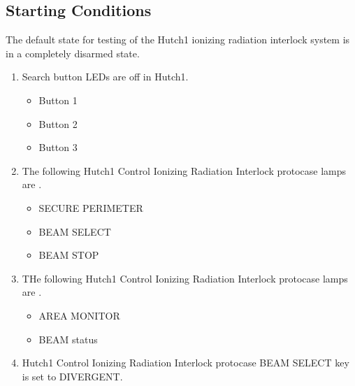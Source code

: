 \documentclass[letterpaper,10pt,english]{sphinxmanual}
\begin{document}
\subsection{Starting Conditions}
\label{\detokenize{testing_documentation/Hutch-1_ionizing_radiation:starting-conditions}}
\sphinxAtStartPar
The default state for testing of the Hutch\sphinxhyphen{}1 ionizing radiation interlock system is in a completely disarmed state.
\begin{enumerate}
%
\item {} 
\sphinxAtStartPar
Search button LEDs are off in Hutch\sphinxhyphen{}1.
\begin{itemize}
\item {} 
\sphinxAtStartPar
Button 1

\item {} 
\sphinxAtStartPar
Button 2

\item {} 
\sphinxAtStartPar
Button 3

\end{itemize}

\item {} 
\sphinxAtStartPar
The following Hutch\sphinxhyphen{}1 Control Ionizing Radiation Interlock protocase lamps are .
\begin{itemize}
\item {} 
\sphinxAtStartPar
SECURE PERIMETER

\item {} 
\sphinxAtStartPar
BEAM SELECT

\item {} 
\sphinxAtStartPar
BEAM STOP

\end{itemize}

\item {} 
\sphinxAtStartPar
THe following Hutch\sphinxhyphen{}1 Control Ionizing Radiation Interlock protocase lamps are .
\begin{itemize}
\item {} 
\sphinxAtStartPar
AREA MONITOR

\item {} 
\sphinxAtStartPar
BEAM status

\end{itemize}

\item {} 
\sphinxAtStartPar
Hutch\sphinxhyphen{}1 Control Ionizing Radiation Interlock protocase BEAM SELECT key is set to DIVERGENT.


\end{enumerate}
\end{document}
